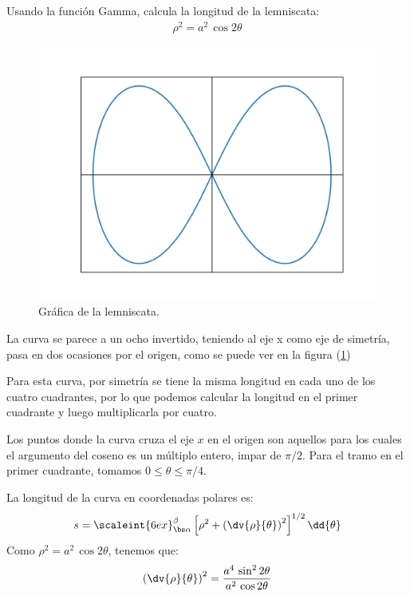 Usando la función Gamma, calcula la longitud de la lemniscata:
\begin{align*}
\rho^{2} = a^{2} \, \cos 2 \theta
\end{align*}
\begin{figure}
    \centering
    \includegraphics[scale=0.13]{Imagenes/plot_leminscata_01.png}
    \caption{Gráfica de la lemniscata.}
    \label{fig:figura_lemniscata}
\end{figure}
La curva se parece a un ocho invertido, teniendo al eje x como eje de simetría, pasa en dos ocasiones por el origen, como se puede ver en la figura (\ref{fig:figura_lemniscata})
\par
Para esta curva, por simetría se tiene la misma longitud en cada uno de los cuatro cuadrantes, por lo que podemos calcular la longitud en el primer cuadrante y luego multiplicarla por cuatro.
\par
Los puntos donde la curva cruza el eje $x$ en el origen son aquellos para los cuales el argumento del coseno es un múltiplo entero, impar de $\pi / 2$.  Para el tramo en el primer cuadrante, tomamos $0 \leq \theta \leq \pi/4$.
\par
La longitud de la curva en coordenadas polares es:
\begin{align*}
s = \scaleint{6ex}_{\bs \alpha}^{\beta} \left[ \rho^{2} + \left( \dv{\rho}{\theta} \right)^{2} \right]^{1/2} \dd{\theta}
\end{align*}
Como $\rho^{2} = a^{2} \, \cos 2 \theta$, tenemos que:
\begin{align*}
\left( \dv{\rho}{\theta} \right)^{2} = \dfrac{a^{4} \, \sin^{2} 2 \theta}{a^{2} \, \cos 2 \theta}
\end{align*}
